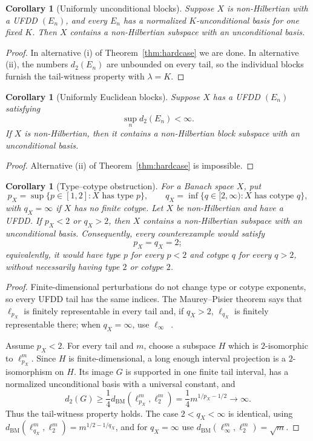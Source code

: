 \documentclass[11pt]{article}
\newtheorem{corollary}[theorem]{Corollary}
\theoremstyle{definition}
\newcommand{\dd}{d_2}
\newcommand{\BM}{d_{\mathrm{BM}}}
\begin{document}
\begin{corollary}[Uniformly unconditional blocks]\label{cor:uniform-blocks}
Suppose $X$ is non-Hilbertian with a UFDD $(E_n)$, and every $E_n$ has a
normalized $K$-unconditional basis for one fixed $K$.  Then $X$ contains a
non-Hilbertian subspace with an unconditional basis.
\end{corollary}

\begin{proof}
In alternative (i) of Theorem~\ref{thm:hardcase} we are done.  In alternative
(ii), the numbers $\dd(E_n)$ are unbounded on every tail, so the individual
blocks furnish the tail-witness property with $\lambda=K$.
\end{proof}

\begin{corollary}[Uniformly Euclidean blocks]
Suppose $X$ has a UFDD $(E_n)$ satisfying
\[
  \sup_n\dd(E_n)<\infty.
\]
If $X$ is non-Hilbertian, then it contains a non-Hilbertian block subspace
with an unconditional basis.
\end{corollary}

\begin{proof}
Alternative (ii) of Theorem~\ref{thm:hardcase} is impossible.
\end{proof}

\begin{corollary}[Type--cotype obstruction]\label{cor:type-cotype}
For a Banach space $X$, put
\[
 p_X=\sup\{p\in[1,2]:X\text{ has type }p\},\qquad
 q_X=\inf\{q\in[2,\infty):X\text{ has cotype }q\},
\]
with $q_X=\infty$ if $X$ has no finite cotype.  Let $X$ be non-Hilbertian and
have a UFDD.  If $p_X<2$ or $q_X>2$, then $X$ contains a non-Hilbertian
subspace with an unconditional basis.  Consequently, every counterexample
would satisfy
\[
  p_X=q_X=2;
\]
equivalently, it would have type $p$ for every $p<2$ and cotype $q$ for every
$q>2$, without necessarily having type $2$ or cotype $2$.
\end{corollary}

\begin{proof}
Finite-dimensional perturbations do not change type or cotype exponents, so
every UFDD tail has the same indices.  The Maurey--Pisier theorem says that
$\ell_{p_X}$ is finitely representable in every tail and, if $q_X>2$,
$\ell_{q_X}$ is finitely representable there; when $q_X=\infty$, use
$\ell_\infty$~\cite{MP}.

Assume $p_X<2$.  For every tail and $m$, choose a subspace $H$ which is
$2$-isomorphic to $\ell_{p_X}^m$.  Since $H$ is finite-dimensional, a long
enough interval projection is a $2$-isomorphism on $H$.  Its image $G$ is
supported in one finite tail interval, has a normalized unconditional basis
with a universal constant, and
\[
 \dd(G)\geq \frac14\BM(\ell_{p_X}^m,\ell_2^m)
          =\frac14m^{1/p_X-1/2}\longrightarrow\infty.
\]
Thus the tail-witness property holds.  The case $2<q_X<\infty$ is identical,
using $\BM(\ell_{q_X}^m,\ell_2^m)=m^{1/2-1/q_X}$, and for $q_X=\infty$ use
$\BM(\ell_\infty^m,\ell_2^m)=\sqrt m$.
\end{proof}
\end{document}
